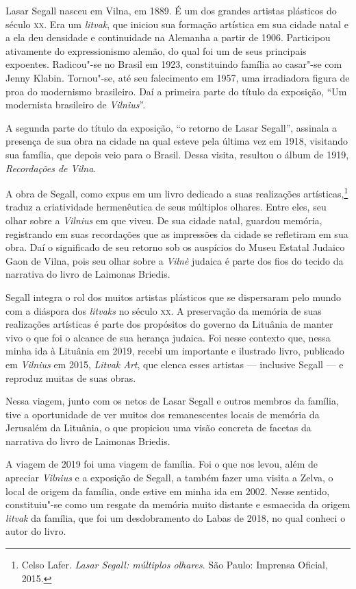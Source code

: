 Lasar Segall nasceu em Vilna, em 1889. É um dos grandes artistas
plásticos do século \textsc{xx}. Era um \textit{litvak}, que iniciou sua formação
artística em sua cidade natal e a ela deu densidade e continuidade na
Alemanha a partir de 1906. Participou ativamente do expressionismo
alemão, do qual foi um de seus principais expoentes. Radicou"-se no
Brasil em 1923, constituindo família ao casar"-se com Jenny Klabin.
Tornou"-se, até seu falecimento em 1957, uma irradiadora figura de proa
do modernismo brasileiro. Daí a primeira parte do título da exposição,
``Um modernista brasileiro de \textit{Vilnius}''.

A segunda parte do título da exposição, ``o retorno de Lasar Segall'',
assinala a presença de sua obra na cidade na qual esteve pela última vez
em 1918, visitando sua família, que depois veio para o Brasil. Dessa
visita, resultou o álbum de 1919, \textit{Recordações de Vilna}.

A obra de Segall, como expus em um livro dedicado a suas realizações
artísticas,\footnote{Celso Lafer. \textit{Lasar Segall: múltiplos
  olhares}. São Paulo: Imprensa Oficial, 2015.} traduz a criatividade
hermenêutica de seus múltiplos olhares. Entre eles, seu olhar sobre a
\textit{Vilnius} em que viveu. De sua cidade natal, guardou memória, registrando
em suas recordações que as impressões da cidade se refletiram em sua
obra. Daí o significado de seu retorno sob os auspícios do Museu Estatal
Judaico Gaon de Vilna, pois seu olhar sobre a \textit{Vilnè} judaica é parte dos
fios do tecido da narrativa do livro de Laimonas Briedis.

Segall integra o rol dos muitos artistas plásticos que se dispersaram
pelo mundo com a diáspora dos \textit{litvaks} no século \textsc{xx}. A preservação
da memória de suas realizações artísticas é parte dos propósitos do
governo da Lituânia de manter vivo o que foi o alcance de sua herança
judaica. Foi nesse contexto que, nessa minha ida à Lituânia em 2019,
recebi um importante e ilustrado livro, publicado em \textit{Vilnius} em 2015,
\textit{Litvak Art}, que elenca esses artistas --- inclusive Segall --- e
reproduz muitas de suas obras.

Nessa viagem, junto com os netos de Lasar Segall e outros membros da
família, tive a oportunidade de ver muitos dos remanescentes locais de
memória da Jerusalém da Lituânia, o que propiciou uma visão concreta de
facetas da narrativa do livro de Laimonas Briedis.

A viagem de 2019 foi uma viagem de família. Foi o que nos levou, além de
apreciar \textit{Vilnius} e a exposição de Segall, a também fazer uma visita a
Zelva, o local de origem da família, onde estive em minha ida em 2002.
Nesse sentido, constituiu"-se como um resgate da memória muito distante e
esmaecida da origem \textit{litvak} da família, que foi um desdobramento
do Labas de 2018, no qual conheci o autor do livro.

